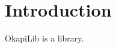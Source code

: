 \hypertarget{index_intro_sec}{}\section{Introduction}\label{index_intro_sec}
Okapi\+Lib is a library. 
